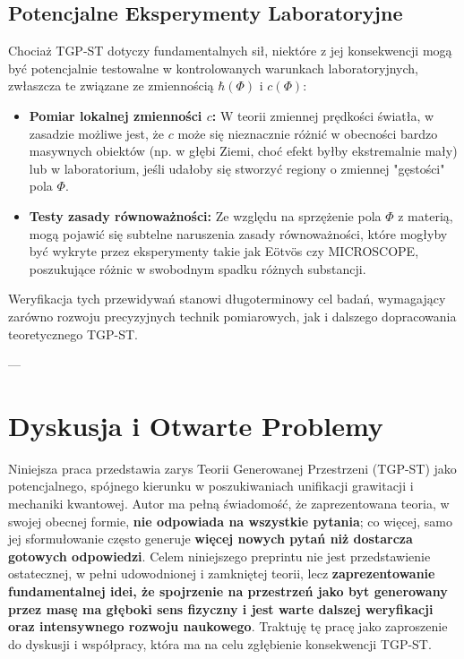 \documentclass[11pt,a4paper]{article}
\begin{document}
\subsection{Potencjalne Eksperymenty Laboratoryjne}
Chociaż TGP-ST dotyczy fundamentalnych sił, niektóre z jej konsekwencji mogą być potencjalnie testowalne w kontrolowanych warunkach laboratoryjnych, zwłaszcza te związane ze zmiennością $\hbar(\Phi)$ i $c(\Phi)$:
\begin{itemize}
    \item \textbf{Pomiar lokalnej zmienności $c$:} W teorii zmiennej prędkości światła, w zasadzie możliwe jest, że $c$ może się nieznacznie różnić w obecności bardzo masywnych obiektów (np. w głębi Ziemi, choć efekt byłby ekstremalnie mały) lub w laboratorium, jeśli udałoby się stworzyć regiony o zmiennej "gęstości" pola $\Phi$.
    \item \textbf{Testy zasady równoważności:} Ze względu na sprzężenie pola $\Phi$ z materią, mogą pojawić się subtelne naruszenia zasady równoważności, które mogłyby być wykryte przez eksperymenty takie jak Eötvös czy MICROSCOPE, poszukujące różnic w swobodnym spadku różnych substancji.
\end{itemize}
Weryfikacja tych przewidywań stanowi długoterminowy cel badań, wymagający zarówno rozwoju precyzyjnych technik pomiarowych, jak i dalszego dopracowania teoretycznego TGP-ST.

---

\section{Dyskusja i Otwarte Problemy}
\label{sec:OtwarteProblemy}

Niniejsza praca przedstawia zarys Teorii Generowanej Przestrzeni (TGP-ST) jako potencjalnego, spójnego kierunku w poszukiwaniach unifikacji grawitacji i mechaniki kwantowej. Autor ma pełną świadomość, że zaprezentowana teoria, w swojej obecnej formie, \textbf{nie odpowiada na wszystkie pytania}; co więcej, samo jej sformułowanie często generuje \textbf{więcej nowych pytań niż dostarcza gotowych odpowiedzi}. Celem niniejszego preprintu nie jest przedstawienie ostatecznej, w pełni udowodnionej i zamkniętej teorii, lecz \textbf{zaprezentowanie fundamentalnej idei, że spojrzenie na przestrzeń jako byt generowany przez masę ma głęboki sens fizyczny i jest warte dalszej weryfikacji oraz intensywnego rozwoju naukowego}. Traktuję tę pracę jako zaproszenie do dyskusji i współpracy, która ma na celu zgłębienie konsekwencji TGP-ST.
\end{document}

